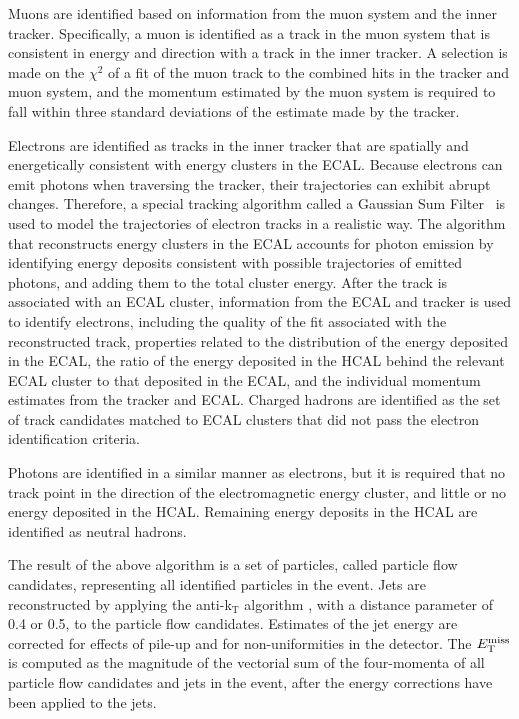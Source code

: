Muons are identified based on information from the muon system and the inner tracker.  Specifically, a muon is identified as a track in the muon system that is consistent in energy and direction with a track in the inner tracker. A selection is made on the $\chi^2$ of a fit of the muon track to the combined hits in the tracker and muon system, and the momentum estimated by the muon system is required to fall within three standard deviations of the estimate made by the tracker.  

Electrons are identified as tracks in the inner tracker that are spatially and energetically consistent with energy clusters in the ECAL. Because electrons can emit photons when traversing the tracker, their trajectories can exhibit abrupt changes. Therefore, a special tracking algorithm called a Gaussian Sum Filter~\cite{Beaudette:2014cea} is used to model the trajectories of electron tracks in a realistic way. The algorithm that reconstructs energy clusters in the ECAL accounts for photon emission by identifying energy deposits consistent with possible trajectories of emitted photons, and adding them to the total cluster energy.  After the track is associated with an ECAL cluster, information from the ECAL and tracker is used to identify electrons, including the quality of the fit associated with the reconstructed track,  properties related to the distribution of the energy deposited in the ECAL, the ratio of the energy deposited in the HCAL behind the relevant ECAL cluster to that deposited in the ECAL, and the individual momentum estimates from the tracker and ECAL. Charged hadrons are identified as the set of track candidates matched to ECAL clusters that did not pass the electron identification criteria. 

Photons are identified in a similar manner as electrons, but it is required that no track point in the direction of the electromagnetic energy cluster, and little or no energy deposited in the HCAL. Remaining energy deposits in the HCAL are identified as neutral hadrons. 

The result of the above algorithm is a set of particles, called particle flow candidates, representing all identified particles in the event. Jets are reconstructed by applying the anti-k$_{\text{T}}$ algorithm \cite{Cacciari:2008gp}, with a distance parameter of 0.4 or 0.5, to the particle flow candidates. Estimates of the jet energy are corrected for effects of pile-up and for non-uniformities in the detector. The $E_{\text{T}}^{\rm miss}$ is computed as the magnitude of the vectorial sum of the four-momenta of all particle flow candidates and jets in the event, after the energy corrections have been applied to the jets.

\label{sec:Trigger}




